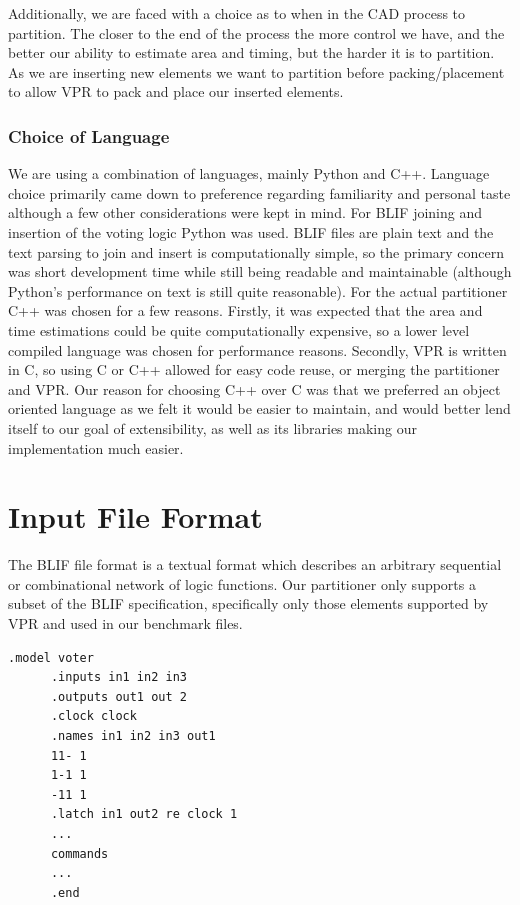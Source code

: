 \documentclass[12pt,final,oneside]{dwThesis} %
\begin{document}
   Additionally, we are faced with a choice as to when in the \ac{CAD} process to partition. The closer to the end of the process the more control we have, and the better our ability to estimate area and timing, but the harder it is to partition. As we are inserting new elements we want to partition before packing/placement to allow \ac{VPR} to pack and place our inserted elements.

   \subsubsection{Choice of Language}
   We are using a combination of languages, mainly Python and C++. Language choice primarily came down to preference regarding familiarity and personal taste although a few other considerations were kept in mind.
   For \ac{BLIF} joining and insertion of the voting logic Python was used. \ac{BLIF} files are plain text and the text parsing to join and insert is computationally simple, so the primary concern was short development time while still being readable and maintainable (although Python's performance on text is still quite reasonable)\cite{LanguageBenchmark}.
   For the actual partitioner C++ was chosen for a few reasons. Firstly, it was expected that the area and time estimations could be quite computationally expensive, so a lower level compiled language was chosen for performance reasons\cite{LanguageBenchmark}. Secondly, \ac{VPR} is written in C, so using C or C++ allowed for easy code reuse, or merging the partitioner and \ac{VPR}. Our reason for choosing C++ over C was that we preferred an object oriented language as we felt it would be easier to maintain, and would better lend itself to our goal of extensibility, as well as its libraries making our implementation much easier.

   \section{Input File Format}\label{secBlif}
   The \ac{BLIF} file format is a textual format which describes an arbitrary sequential or combinational network of logic functions\cite{BLIF}.
   Our partitioner only supports a subset of the \ac{BLIF} specification, specifically only those elements supported by \ac{VPR} and used in our benchmark files.
   \begin{lstlisting}[caption=BLIF file layout, label=SampleBlif]
      .model voter
      .inputs in1 in2 in3
      .outputs out1 out 2
      .clock clock
      .names in1 in2 in3 out1
      11- 1
      1-1 1
      -11 1
      .latch in1 out2 re clock 1
      ...
      commands
      ...
      .end
   \end{lstlisting}
\end{document}
